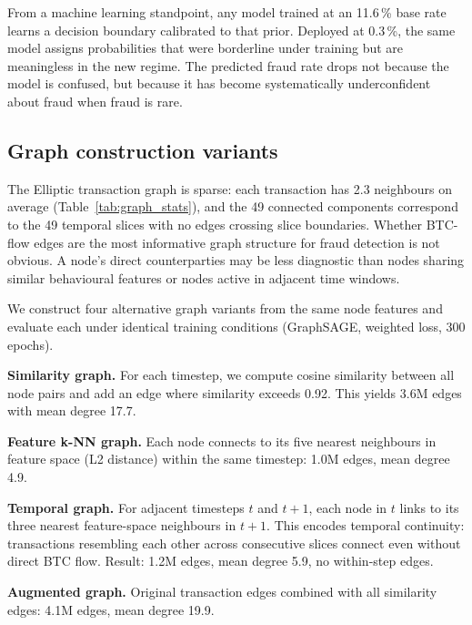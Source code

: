 From a machine learning standpoint, any model trained at an 11.6\,\%
base rate learns a decision boundary calibrated to that prior.
Deployed at 0.3\,\%, the same model assigns probabilities that were
borderline under training but are meaningless in the new regime.
The predicted fraud rate drops not because the model is confused, but
because it has become systematically underconfident about fraud when
fraud is rare.

\subsection{Graph construction variants}
\label{sec:graph_construction}

The Elliptic transaction graph is sparse: each transaction has 2.3
neighbours on average (Table~\ref{tab:graph_stats}), and the 49
connected components correspond to the 49 temporal slices with no
edges crossing slice boundaries.  Whether BTC-flow edges are the most
informative graph structure for fraud detection is not obvious.  A
node's direct counterparties may be less diagnostic than nodes sharing
similar behavioural features or nodes active in adjacent time windows.

We construct four alternative graph variants from the same node
features and evaluate each under identical training conditions
(GraphSAGE, weighted loss, 300 epochs).

\textbf{Similarity graph.}  For each timestep, we compute cosine
similarity between all node pairs and add an edge where similarity
exceeds 0.92.  This yields 3.6M edges with mean degree 17.7.

\textbf{Feature k-NN graph.}  Each node connects to its five nearest
neighbours in feature space (L2 distance) within the same timestep:
1.0M edges, mean degree 4.9.

\textbf{Temporal graph.}  For adjacent timesteps $t$ and $t{+}1$, each
node in $t$ links to its three nearest feature-space neighbours in
$t{+}1$.  This encodes temporal continuity: transactions resembling
each other across consecutive slices connect even without direct BTC
flow.  Result: 1.2M edges, mean degree 5.9, no within-step edges.

\textbf{Augmented graph.}  Original transaction edges combined with all
similarity edges: 4.1M edges, mean degree 19.9.


